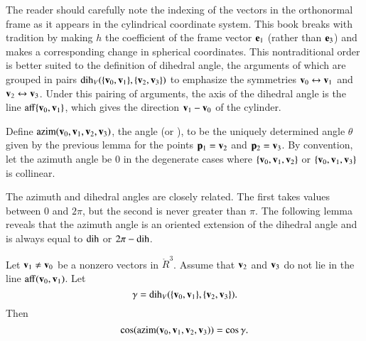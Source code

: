 \begin{remark}
The reader should carefully note the indexing of the vectors in the
orthonormal frame as it appears in the cylindrical coordinate system.
This book breaks with tradition by making $h$ the coefficient of the
frame vector ${\mathbf e}_1$ (rather than ${\mathbf e}_3$) and makes a corresponding
change in spherical coordinates.  This nontraditional order is better
suited to the definition of dihedral angle, the arguments of which 
 are grouped in pairs $\operatorname{dih}_V(\{{\mathbf v}_0,{\mathbf v}_1\},\{{\mathbf v}_2,{\mathbf v}_3\})$
to emphasize the symmetries
${\mathbf v}_0\leftrightarrow{\mathbf v}_1$ and ${\mathbf v}_2\leftrightarrow{\mathbf v}_3$.  Under this pairing
of arguments, the axis of the dihedral angle is the line
${\operatorname{aff}}\{{\mathbf v}_0,{\mathbf v}_1\}$, which gives the direction ${\mathbf v}_1-{\mathbf v}_0$ of the cylinder.
%
%
\end{remark}

\begin{definition}[azim]
  Define ${\operatorname{azim}}({\mathbf v}_0,{\mathbf v}_1,{\mathbf v}_2,{\mathbf v}_3)$, the  angle
  (or ), to be the uniquely determined angle
  $\theta$  given by the previous lemma for the points ${\mathbf p}_1={\mathbf v}_2$ and ${\mathbf p}_2={\mathbf v}_3$.
  By convention, let the azimuth angle be $0$ in the degenerate cases
  where $\{{\mathbf v}_0,{\mathbf v}_1,{\mathbf v}_2\}$ or $\{{\mathbf v}_0,{\mathbf v}_1,{\mathbf v}_3\}$ is collinear.
\end{definition}


The azimuth and dihedral angles are closely related.  The first
 takes values between $0$ and $2\pi$, but the second is
never greater than $\pi$.  The following lemma reveals that the
azimuth angle is an oriented extension of the dihedral angle and is always
equal to $\operatorname{dih}$ or $2\pi - \operatorname{dih}$.  %
%
%
%

\begin{lemma}[]\label{lemma:dih-azim}
     Let
  ${\mathbf v}_1\ne {\mathbf v}_0$ be a nonzero vectors in $\ring{R}^3$.  Assume that
  ${\mathbf v}_2$ and ${\mathbf v}_3$ do not lie in the line ${\operatorname{aff}}({\mathbf v}_0,{\mathbf v}_1)$.  Let
\[ 
\gamma = \operatorname{dih}_V(\{{\mathbf v}_0,{\mathbf v}_1\},\{{\mathbf v}_2,{\mathbf v}_3\}).
\] 
Then
\[ 
\cos({\operatorname{azim}}({\mathbf v}_0,{\mathbf v}_1,{\mathbf v}_2,{\mathbf v}_3)) = \cos\gamma.
\] 
\end{lemma}


